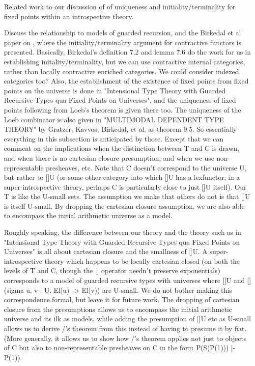 \begin{TODOblock}
Related work to our discussion of of uniqueness and initiality/terminality for fixed points within an introspective theory.

Discuss the relationship to models of guarded recursion, and the Birkedal et al paper on , where the initiality/terminality argument for contractive functors is presented. Basically, Birkedal's definition 7.2 and lemma 7.6 do the work for us in establishing initality/terminality, but we can use contractive internal categories, rather than locally contractive enriched categories. We could consider indexed categories too? Also, the establishment of the existence of fixed points from fixed points on the universe is done in "Intensional Type Theory with Guarded Recursive Types qua Fixed Points on Universes", and the uniqueness of fixed points following from Loeb's theorem is given there too. The uniqueness of the Loeb combinator is also given in "MULTIMODAL DEPENDENT TYPE THEORY" by Gratzer, Kavvos, Birkedal, et al, as theorem 9.5. So essentially everything in this subsection is anticipated by those. Except that we can comment on the implications when the distinction between T and C is drawn, and when there is no cartesian closure presumption, and when we use non-representable presheaves, etc. Note that C doesn't correspond to the universe U, but rather to []U (or some other category into which []U has a lexfunctor; in a super-introspective theory, perhaps C is particularly close to just []U itself). Our T is like the U-small sets. The assumption we make that others do not is that []U is itself U-small. By dropping the cartesian closure assumption, we are also able to encompass the initial arithmetic universe as a model.

Roughly speaking, the difference between our theory and the theory such as in "Intensional Type Theory with Guarded Recursive Types qua Fixed Points on Universes" is all about cartesian closure and the smallness of []U. A super-introspective theory which happens to be locally cartesian closed (on both the levels of T and C, though the [] operator needn't preserve exponentials) corresponds to a model of guarded recursive types with universes where []U and [](sigma u, v : U. El(u) -> El(v)) are U-small. We do not bother making this correspondence formal, but leave it for future work. The dropping of cartesian closure from the presumptions allows us to encompass the initial arithmetic universe and its ilk as models, while adding the presumption of []U etc as U-small allows us to derive \Loeb/'s theorem from this instead of having to presume it by fiat. (More generally, it allows us to show how \Loeb/'s theorem applies not just to objects of C but also to non-representable presheaves on C in the form P(S(P(1))) |- P(1)).
\end{TODOblock}

